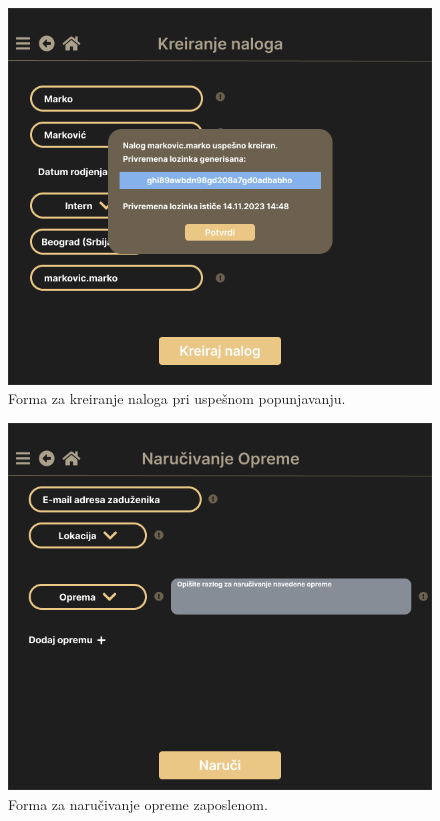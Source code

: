 \documentclass[a4paper]{article}
\begin{document}
\begin{figure} [!ht]
    \begin{center}
        \includegraphics[scale=0.33]{UI/Administrator/Administrator_KreiranjeNaloga_Uspesno.png}
    \end{center}
\caption{Forma za kreiranje naloga pri uspešnom popunjavanju.}
\end{figure}

\begin{figure} [!ht]
    \begin{center}
        \includegraphics[scale=0.33]{UI/Administrator/Administrator_NarucivanjeOpreme_Forma.png}
    \end{center}
\caption{Forma za naručivanje opreme zaposlenom.}
\end{figure}
\end{document}

